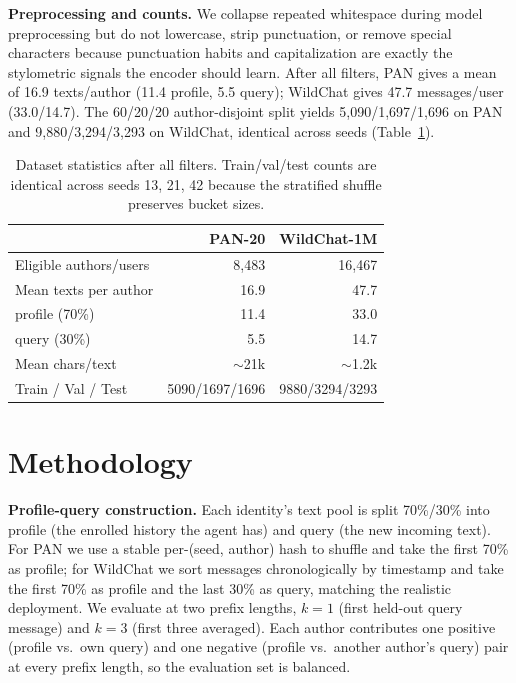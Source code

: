 \documentclass[11pt]{article}
\begin{document}
\noindent\textbf{Preprocessing and counts.} We collapse repeated whitespace during model preprocessing but do not lowercase, strip punctuation, or remove special characters because punctuation habits and capitalization are exactly the stylometric signals the encoder should learn. After all filters, PAN gives a mean of 16.9 texts/author (11.4 profile, 5.5 query); WildChat gives 47.7 messages/user (33.0/14.7). The 60/20/20 author-disjoint split yields 5{,}090/1{,}697/1{,}696 on PAN and 9{,}880/3{,}294/3{,}293 on WildChat, identical across seeds (Table~\ref{tab:datastats}).

\begin{table}[t]
\centering
\small
\begin{tabular}{lrr}
\toprule
& \textbf{PAN-20} & \textbf{WildChat-1M} \\
\midrule
Eligible authors/users     & 8{,}483   & 16{,}467 \\
Mean texts per author      & 16.9      & 47.7 \\
\quad profile (70\%)       & 11.4      & 33.0 \\
\quad query (30\%)         & 5.5       & 14.7 \\
Mean chars/text            & $\sim$21k & $\sim$1.2k \\
Train / Val / Test         & 5090/1697/1696 & 9880/3294/3293 \\
\bottomrule
\end{tabular}
\caption{Dataset statistics after all filters. Train/val/test counts are identical across seeds 13, 21, 42 because the stratified shuffle preserves bucket sizes.}
\label{tab:datastats}
\end{table}

\section{Methodology}
\label{sec:method}


\noindent\textbf{Profile-query construction.} Each identity's text pool is split 70\%/30\% into profile (the enrolled history the agent has) and query (the new incoming text). For PAN we use a stable per-(seed, author) hash to shuffle and take the first 70\% as profile; for WildChat we sort messages chronologically by timestamp and take the first 70\% as profile and the last 30\% as query, matching the realistic deployment. We evaluate at two prefix lengths, $k{=}1$ (first held-out query message) and $k{=}3$ (first three averaged). Each author contributes one positive (profile vs.\ own query) and one negative (profile vs.\ another author's query) pair at every prefix length, so the evaluation set is balanced.
\end{document}
